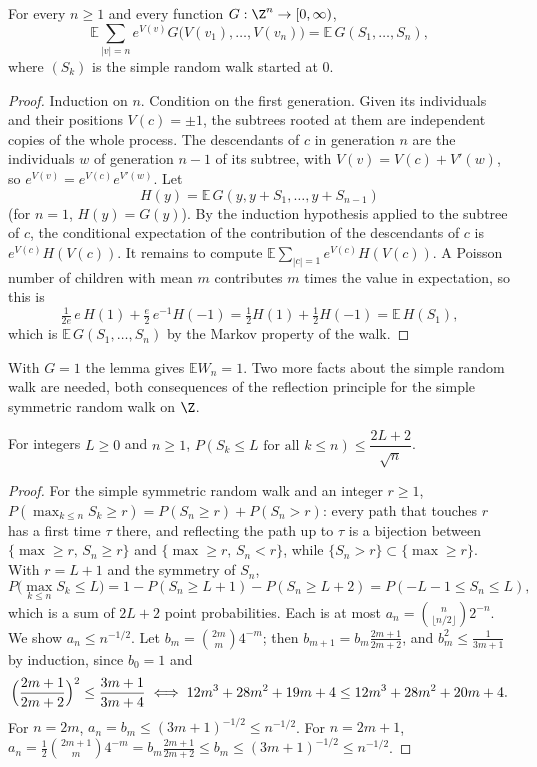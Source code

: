 \begin{lemma}\label{lem:manytoone}
For every $n\ge1$ and every function $G:\Z^n\to[0,\infty)$,
\[
\mathbb E\sum_{|v|=n}e^{V(v)}G\bigl(V(v_1),\dots,V(v_n)\bigr)=\mathbb E\,G(S_1,\dots,S_n),
\]
where $(S_k)$ is the simple random walk started at $0$.
\end{lemma}

\begin{proof}
Induction on $n$. Condition on the first generation. Given its individuals and their positions $V(c)=\pm1$, the subtrees rooted at them are independent copies of the whole process. The descendants of $c$ in generation $n$ are the individuals $w$ of generation $n-1$ of its subtree, with $V(v)=V(c)+V'(w)$, so $e^{V(v)}=e^{V(c)}e^{V'(w)}$. Let
\[
H(y)=\mathbb E\,G(y,y+S_1,\dots,y+S_{n-1})
\]
(for $n=1$, $H(y)=G(y)$). By the induction hypothesis applied to the subtree of $c$, the conditional expectation of the contribution of the descendants of $c$ is $e^{V(c)}H(V(c))$. It remains to compute $\mathbb E\sum_{|c|=1}e^{V(c)}H(V(c))$. A Poisson number of children with mean $m$ contributes $m$ times the value in expectation, so this is
\[
\tfrac1{2e}\,e\,H(1)+\tfrac e2\,e^{-1}H(-1)=\tfrac12H(1)+\tfrac12H(-1)=\mathbb E\,H(S_1),
\]
which is $\mathbb E\,G(S_1,\dots,S_n)$ by the Markov property of the walk.
\end{proof}

With $G=1$ the lemma gives $\mathbb EW_n=1$. Two more facts about the simple random walk are needed, both consequences of the reflection principle for the simple symmetric random walk on $\Z$.

\begin{lemma}\label{lem:ballotbound}
For integers $L\ge0$ and $n\ge1$, $P(S_k\le L\text{ for all }k\le n)\le\dfrac{2L+2}{\sqrt n}$.
\end{lemma}

\begin{proof}
For the simple symmetric random walk and an integer $r\ge1$, $P(\max_{k\le n}S_k\ge r)=P(S_n\ge r)+P(S_n>r)$: every path that touches $r$ has a first time $\tau$ there, and reflecting the path up to $\tau$ is a bijection between $\{\max\ge r,\,S_n\ge r\}$ and $\{\max\ge r,\,S_n<r\}$, while $\{S_n>r\}\subset\{\max\ge r\}$. With $r=L+1$ and the symmetry of $S_n$,
\[
P\bigl(\max_{k\le n}S_k\le L\bigr)=1-P(S_n\ge L+1)-P(S_n\ge L+2)=P(-L-1\le S_n\le L),
\]
which is a sum of $2L+2$ point probabilities. Each is at most $a_n=\binom n{\lfloor n/2\rfloor}2^{-n}$. We show $a_n\le n^{-1/2}$. Let $b_m=\binom{2m}m4^{-m}$; then $b_{m+1}=b_m\frac{2m+1}{2m+2}$, and $b_m^2\le\frac1{3m+1}$ by induction, since $b_0=1$ and
\[
\Bigl(\frac{2m+1}{2m+2}\Bigr)^2\le\frac{3m+1}{3m+4}\iff12m^3+28m^2+19m+4\le12m^3+28m^2+20m+4.
\]
For $n=2m$, $a_n=b_m\le(3m+1)^{-1/2}\le n^{-1/2}$. For $n=2m+1$, $a_n=\frac12\binom{2m+1}m4^{-m}=b_m\frac{2m+1}{2m+2}\le b_m\le(3m+1)^{-1/2}\le n^{-1/2}$.
\end{proof}

